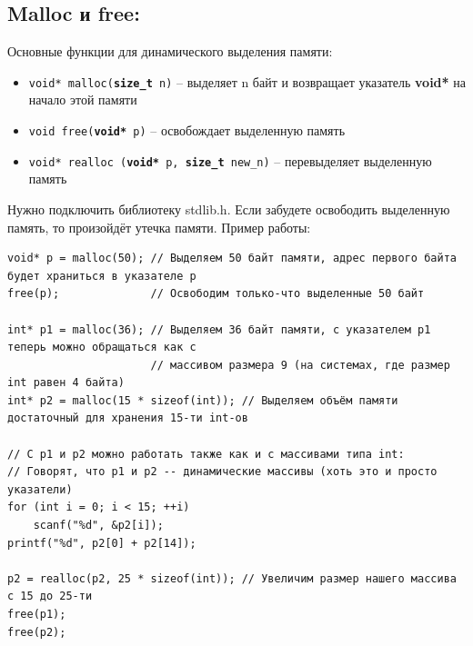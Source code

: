 \documentclass{article}
\begin{document}
\subsection*{Malloc и free:}
Основные функции для динамического выделения памяти:
\begin{itemize}
\item \texttt{void* malloc(\textbf{size\_t} n)} -- выделяет n байт и возвращает указатель \textbf{void*}
на начало этой памяти \\
\item \texttt{void free(\textbf{void*} p)} -- освобождает выделенную память\\
\item \texttt{void* realloc (\textbf{void*} p, \textbf{size\_t} new\_n)} -- перевыделяет выделенную память\\
\end{itemize}
Нужно подключить библиотеку stdlib.h. Если забудете освободить выделенную память, то произойдёт утечка памяти.
Пример работы:
\begin{verbatim}
void* p = malloc(50); // Выделяем 50 байт памяти, адрес первого байта будет храниться в указателе p
free(p);              // Освободим только-что выделенные 50 байт

int* p1 = malloc(36); // Выделяем 36 байт памяти, с указателем p1 теперь можно обращаться как с
                      // массивом размера 9 (на системах, где размер int равен 4 байта)
int* p2 = malloc(15 * sizeof(int)); // Выделяем объём памяти достаточный для хранения 15-ти int-ов

// C p1 и p2 можно работать также как и с массивами типа int:
// Говорят, что p1 и p2 -- динамические массивы (хоть это и просто указатели)
for (int i = 0; i < 15; ++i)
    scanf("%d", &p2[i]);
printf("%d", p2[0] + p2[14]);

p2 = realloc(p2, 25 * sizeof(int)); // Увеличим размер нашего массива с 15 до 25-ти
free(p1);
free(p2);
\end{verbatim}
\end{document}
